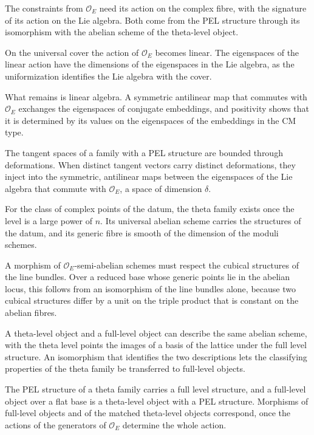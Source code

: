 The constraints from $\mathcal O_E$ need its action on the complex fibre, with the signature of its action on the Lie
algebra. Both come from the PEL structure through its isomorphism with the abelian scheme of the theta-level object.

On the universal cover the action of $\mathcal O_E$ becomes linear. The eigenspaces of the linear action have the
dimensions of the eigenspaces in the Lie algebra, as the uniformization identifies the Lie algebra with the cover.

What remains is linear algebra. A symmetric antilinear map that commutes with $\mathcal O_E$ exchanges the eigenspaces
of conjugate embeddings, and positivity shows that it is determined by its values on the eigenspaces of the embeddings
in the CM type.

The tangent spaces of a family with a PEL structure are bounded through deformations. When distinct
tangent vectors carry distinct deformations, they inject into the symmetric, antilinear maps between the
eigenspaces of the Lie algebra that commute with $\mathcal O_E$, a space of dimension $\delta$.

For the class of complex points of the datum, the theta family exists once the level is a large power
of $n$. Its universal abelian scheme carries the structures of the datum, and its generic fibre is
smooth of the dimension of the moduli schemes.

A morphism of $\mathcal O_E$-semi-abelian schemes must respect the cubical structures of the line
bundles. Over a reduced base whose generic points lie in the abelian locus, this follows from an
isomorphism of the line bundles alone, because two cubical structures differ by a unit on the triple
product that is constant on the abelian fibres.

A theta-level object and a full-level object can describe the same abelian scheme, with the theta
level points the images of a basis of the lattice under the full level structure. An isomorphism that
identifies the two descriptions lets the classifying properties of the theta family be transferred to
full-level objects.

The PEL structure of a theta family carries a full level structure, and a full-level object over a
flat base is a theta-level object with a PEL structure. Morphisms of full-level objects and of the
matched theta-level objects correspond, once the actions of the generators of $\mathcal O_E$ determine
the whole action.

